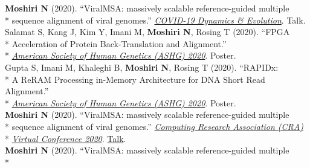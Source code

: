 \documentclass[margin,line]{res}
\begin{document}
\begin{resume}
\hspace*{4mm} \textbf{Moshiri N} (2020). ``ViralMSA: massively scalable reference-guided multiple\\*\vspace{2mm}
\hspace*{8mm} sequence alignment of viral genomes.'' \href{https://cpd.ucsd.edu/covid19/}{\textit{COVID-19 Dynamics \& Evolution}}. Talk.\\
\hspace*{4mm} Salamat S, Kang J, Kim Y, Imani M, \textbf{Moshiri N}, Rosing T (2020). ``FPGA\\*
\hspace*{9mm} Acceleration of Protein Back-Translation and Alignment.''\\*\vspace{2mm}
\hspace*{7mm} \href{https://www.ashg.org/meetings/2020meeting}{\textit{American Society of Human Genetics (ASHG) 2020}}. Poster.\\
\hspace*{4mm} Gupta S, Imani M, Khaleghi B, \textbf{Moshiri N}, Rosing T (2020). ``RAPIDx:\\*
\hspace*{9mm} A ReRAM Processing in-Memory Architecture for DNA Short Read Alignment.''\\*\vspace{2mm}
\hspace*{7mm} \href{https://www.ashg.org/meetings/2020meeting}{\textit{American Society of Human Genetics (ASHG) 2020}}. Poster.\\
\hspace*{4mm} \textbf{Moshiri N} (2020). ``ViralMSA: massively scalable reference-guided multiple\\*
\hspace*{9mm} sequence alignment of viral genomes.'' \href{https://cra.org/events/cra-virtual-conference-2020/}{\textit{Computing Research Association (CRA)}}\\*\vspace{2mm}
\hspace*{8mm} \href{https://cra.org/events/cra-virtual-conference-2020/}{\textit{Virtual Conference 2020}}. \href{https://www.youtube.com/watch?v=PrAoks7OhE8&list=PL6AeXx75lHyyqKgfRmlSM4QUEna0dWDza&index=9&t=0s}{Talk}.\\
\hspace*{4mm} \textbf{Moshiri N} (2020). ``ViralMSA: massively scalable reference-guided multiple\\*

\end{resume}
\end{document}

